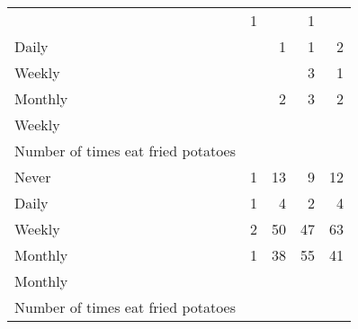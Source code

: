 \documentclass{article}
\begin{document}
\begin{tabular}{lllll}
  \multicolumn{1}{|r}{} &
  \multicolumn{1}{r}{1} &
  \multicolumn{1}{r}{} &
  \multicolumn{1}{r}{1} \\
\multicolumn{1}{l}{\hspace{5em}Daily} &
  \multicolumn{1}{|r}{} &
  \multicolumn{1}{r}{1} &
  \multicolumn{1}{r}{1} &
  \multicolumn{1}{r}{2} \\
\multicolumn{1}{l}{\hspace{5em}Weekly} &
  \multicolumn{1}{|r}{} &
  \multicolumn{1}{r}{} &
  \multicolumn{1}{r}{3} &
  \multicolumn{1}{r}{1} \\
\multicolumn{1}{l}{\hspace{5em}Monthly} &
  \multicolumn{1}{|r}{} &
  \multicolumn{1}{r}{2} &
  \multicolumn{1}{r}{3} &
  \multicolumn{1}{r}{2} \\
\multicolumn{1}{l}{\hspace{3em}Weekly} &
  \multicolumn{1}{|r}{} &
  \multicolumn{1}{r}{} &
  \multicolumn{1}{r}{} &
  \multicolumn{1}{r}{} \\
\multicolumn{1}{l}{\hspace{4em}Number of times eat fried potatoes} &
  \multicolumn{1}{|r}{} &
  \multicolumn{1}{r}{} &
  \multicolumn{1}{r}{} &
  \multicolumn{1}{r}{} \\
\multicolumn{1}{l}{\hspace{5em}Never} &
  \multicolumn{1}{|r}{1} &
  \multicolumn{1}{r}{13} &
  \multicolumn{1}{r}{9} &
  \multicolumn{1}{r}{12} \\
\multicolumn{1}{l}{\hspace{5em}Daily} &
  \multicolumn{1}{|r}{1} &
  \multicolumn{1}{r}{4} &
  \multicolumn{1}{r}{2} &
  \multicolumn{1}{r}{4} \\
\multicolumn{1}{l}{\hspace{5em}Weekly} &
  \multicolumn{1}{|r}{2} &
  \multicolumn{1}{r}{50} &
  \multicolumn{1}{r}{47} &
  \multicolumn{1}{r}{63} \\
\multicolumn{1}{l}{\hspace{5em}Monthly} &
  \multicolumn{1}{|r}{1} &
  \multicolumn{1}{r}{38} &
  \multicolumn{1}{r}{55} &
  \multicolumn{1}{r}{41} \\
\multicolumn{1}{l}{\hspace{3em}Monthly} &
  \multicolumn{1}{|r}{} &
  \multicolumn{1}{r}{} &
  \multicolumn{1}{r}{} &
  \multicolumn{1}{r}{} \\
\multicolumn{1}{l}{\hspace{4em}Number of times eat fried potatoes} &
  \multicolumn{1}{|r}{} &
  \multicolumn{1}{r}{} &
  \multicolumn{1}{r}{} &

\end{tabular}
\end{document}
